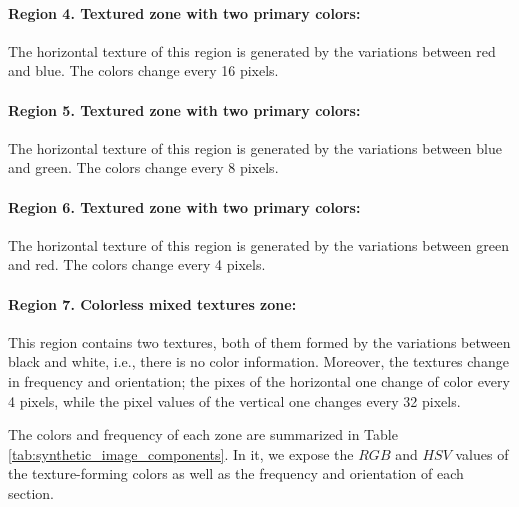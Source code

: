 \paragraph{Region 4. Textured zone with two primary colors:}
The horizontal texture of this region is generated by the variations between red and blue. The colors change every 16 pixels. 

\paragraph{Region 5. Textured zone with two primary colors:}
The horizontal texture of this region is generated by the variations between blue and green. The colors change every 8 pixels. 

\paragraph{Region 6. Textured zone with two primary colors:}
The horizontal texture of this region is generated by the variations between green and red. The colors change every 4 pixels.

\paragraph{Region 7. Colorless mixed textures zone:}
This region contains two textures, both of them formed by the variations between black and white, i.e., there is no color information. Moreover, the textures change in frequency and orientation; the pixes of the horizontal one change of color every 4 pixels, while the pixel values of the vertical one changes every 32 pixels.

The colors and frequency of each zone are summarized in Table \ref{tab:synthetic_image_components}. In it, we expose the $RGB$ and $HSV$ values of the texture-forming colors as well as the frequency and orientation of each section.

